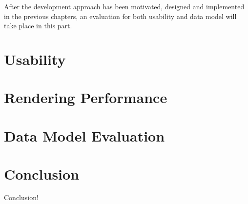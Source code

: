 After the development approach has been motivated, designed and implemented in the previous chapters, an evaluation for both usability and data model  will take place in this part.


\section{Usability}


\section{Rendering Performance}


\section{Data Model Evaluation}




\section{Conclusion}
Conclusion!
